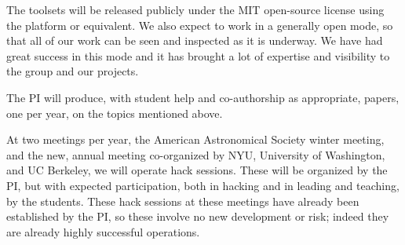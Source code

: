 \documentclass[12pt]{article}
\begin{document}
The toolsets will be released publicly under the MIT open-source
license using the platform  or equivalent.
We also expect to work in a generally open mode, so that all of our
work can be seen and inspected as it is underway.
We have had great success in this mode and it has brought a lot of
expertise and visibility to the group and our projects.

The PI will produce, with student help and co-authorship as
appropriate,  papers, one per year, on
the topics mentioned above.

At two meetings per year, the American Astronomical Society winter
meeting, and the new, annual  meeting
co-organized by NYU, University of Washington, and UC Berkeley, we
will operate hack sessions.  These will be organized by the PI, but
with expected participation, both in hacking and in leading and
teaching, by the students.
These hack sessions at these meetings have already been established by
the PI, so these involve no new development or risk; indeed they are
already highly successful operations.
\end{document}
